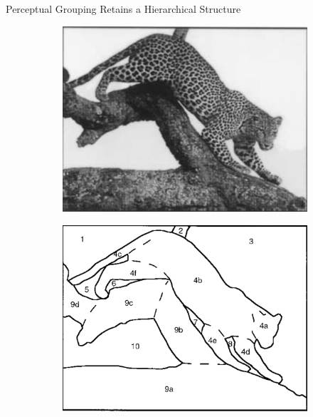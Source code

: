 \documentclass[10pt,xcolor=svgnames]{beamer} %
\begin{document}
\begin{frame}{Perceptual Grouping Retains a Hierarchical Structure}
    \begin{figure}
        \centering
        \begin{subfigure}{0.3\textwidth}
            \centering
            \includegraphics[width=\textwidth]{pictures/perceptualOrganization_1.png}
            \label{fig:perceptualOrg_a}
            \caption{}
        \end{subfigure}
        \hfill
        \begin{subfigure}{0.3\textwidth}
            \centering
            \includegraphics[width=\textwidth]{pictures/perceptualOrganization_2.png}
            \caption{}

\end{subfigure}
\end{figure}
\end{frame}
\end{document}
